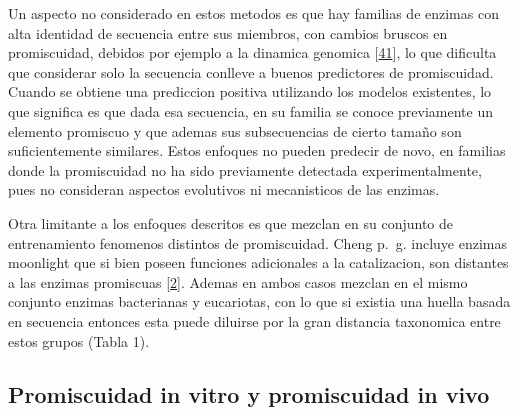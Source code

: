 \documentclass[12pt,twoside]{reedthesis}
\begin{document}
  Un aspecto no considerado en estos metodos es que hay familias de
  enzimas con alta identidad de secuencia entre sus miembros, con cambios
  bruscos en promiscuidad, debidos por ejemplo a la dinamica genomica
  {[}\protect\hyperlink{ref-noda-garcia_evolution_2013}{41}{]}, lo que
  dificulta que considerar solo la secuencia conlleve a buenos predictores
  de promiscuidad. Cuando se obtiene una prediccion positiva utilizando
  los modelos existentes, lo que significa es que dada esa secuencia, en
  su familia se conoce previamente un elemento promiscuo y que ademas sus
  subsecuencias de cierto tamaño son suficientemente similares. Estos
  enfoques no pueden predecir de novo, en familias donde la promiscuidad
  no ha sido previamente detectada experimentalmente, pues no consideran
  aspectos evolutivos ni mecanisticos de las enzimas.
  
  Otra limitante a los enfoques descritos es que mezclan en su conjunto de
  entrenamiento fenomenos distintos de promiscuidad. Cheng p.~g. incluye
  enzimas moonlight que si bien poseen funciones adicionales a la
  catalizacion, son distantes a las enzimas promiscuas
  {[}\protect\hyperlink{ref-copley_enzymes_2003}{2}{]}. Ademas en ambos
  casos mezclan en el mismo conjunto enzimas bacterianas y eucariotas, con
  lo que si existia una huella basada en secuencia entonces esta puede
  diluirse por la gran distancia taxonomica entre estos grupos (Tabla 1).
  
  \subsection{Promiscuidad in vitro y promiscuidad in
  vivo}\label{promiscuidad-in-vitro-y-promiscuidad-in-vivo}
  
\end{document}
